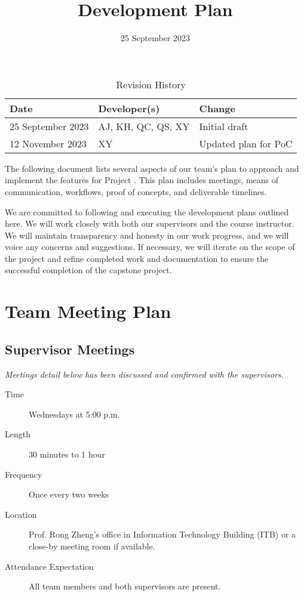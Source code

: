 \documentclass{article}
\title{Development Plan\\\progname}
\author{\authname}
\date{25 September 2023}
\begin{document}
\maketitle

\begin{table}[hp]
  \caption{Revision History} \label{TblRevisionHistory}
  \begin{tabularx}{\textwidth}{llX}
    \toprule
    \textbf{Date} & \textbf{Developer(s)} & \textbf{Change} \\
    \midrule
    25 September 2023 & AJ, KH, QC, QS, XY & Initial draft \\
    12 November 2023 & XY & Updated plan for PoC \\
    \bottomrule
  \end{tabularx}
\end{table}

The following document lists several aspects of our team's plan to approach and
implement the features for Project \projname. This plan includes meetings, means
of communication, workflows, proof of concepts, and deliverable timelines.

We are committed to following and executing the development plans outlined here.
We will work closely with both our supervisors and the course instructor. We
will maintain transparency and honesty in our work progress, and we will voice
any concerns and suggestions. If necessary, we will iterate on the scope of the
project and refine completed work and documentation to ensure the successful
completion of the capstone project.

\section{Team Meeting Plan}

\subsection{Supervisor Meetings}

\emph{Meetings detail below has been discussed and confirmed with the supervisors.}

\begin{description}
\item[Time] Wednesdays at 5:00 p.m.
\item[Length] 30 minutes to 1 hour
\item[Frequency] Once every two weeks
\item[Location] Prof. Rong Zheng's office in Information Technology Building (ITB)
  or a close-by meeting room if available.
\item[Attendance Expectation] All team members and both supervisors are present.
\end{description}
\end{document}
